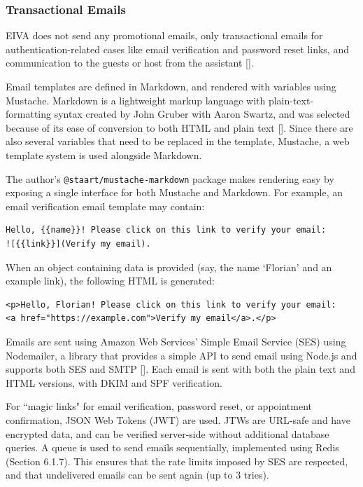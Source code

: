\documentclass{article}
\begin{document}
\subsubsection{Transactional Emails}

EIVA does not send any promotional emails, only transactional emails for authentication-related cases like email verification and password reset links, and communication to the guests or host from the assistant [].

Email templates are defined in Markdown, and rendered with variables using Mustache. Markdown is a lightweight markup language with plain-text-formatting syntax created by John Gruber with Aaron Swartz, and was selected because of its ease of conversion to both HTML and plain text []. Since there are also several variables that need to be replaced in the template, Mustache, a web template system is used alongside Markdown.

The author's \texttt{@staart/mustache-markdown} package makes rendering easy by exposing a single interface for both Mustache and Markdown. For example, an email verification email template may contain:

\begin{verbatim}
Hello, {{name}}! Please click on this link to verify your email:
![{{link}}](Verify my email).
\end{verbatim}

When an object containing data is provided (say, the name `Florian' and an example link), the following HTML is generated:

\begin{verbatim}
<p>Hello, Florian! Please click on this link to verify your email:
<a href="https://example.com">Verify my email</a>.</p>
\end{verbatim}

Emails are sent using Amazon Web Services' Simple Email Service (SES) using Nodemailer, a library that provides a simple API to send email using Node.js and supports both SES and SMTP []. Each email is sent with both the plain text and HTML versions, with DKIM and SPF verification.

For ``magic links" for email verification, password reset, or appointment confirmation, JSON Web Tokens (JWT) are used. JTWs are URL-safe and have encrypted data, and can be verified server-side without additional database queries. A queue is used to send emails sequentially, implemented using Redis (Section 6.1.7). This ensures that the rate limits imposed by SES are respected, and that undelivered emails can be sent again (up to 3 tries).
\end{document}
